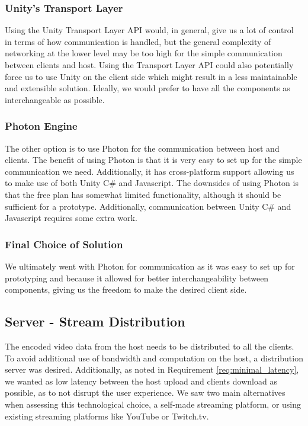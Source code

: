 \subsubsection{Unity's Transport Layer}
Using the Unity Transport Layer API would, in general, give us a lot of control in terms of how communication is handled, but the general complexity of networking at the lower level may be too high for the simple communication between clients and host. Using the Transport Layer API could also potentially force us to use Unity on the client side which might result in a less maintainable and extensible solution. Ideally, we would prefer to have all the components as interchangeable as possible. 
      
\subsubsection{Photon Engine}
The other option is to use Photon for the communication between host and clients. The benefit of using Photon is that it is very easy to set up for the simple communication we need. Additionally, it has cross-platform support allowing us to make use of both Unity C\# and Javascript. The downsides of using Photon is that the free plan has somewhat limited functionality, although it should be sufficient for a prototype. Additionally, communication between Unity C\# and Javascript requires some extra work\cite{photon_javascript}.

\subsubsection{Final Choice of Solution}
We ultimately went with Photon for communication as it was easy to set up for prototyping and because it allowed for better interchangeability between components, giving us the freedom to make the desired client side.

\subsection{Server - Stream Distribution}
The encoded video data from the host needs to be distributed to all the clients. To avoid additional use of bandwidth and computation on the host, a distribution server was desired. Additionally, as noted in Requirement \ref{req:minimal_latency}, we wanted as low latency between the host upload and clients download as possible, as to not disrupt the user experience. We saw two main alternatives when assessing this technological choice, a self-made streaming platform, or using existing streaming platforms like YouTube or Twitch.tv.

